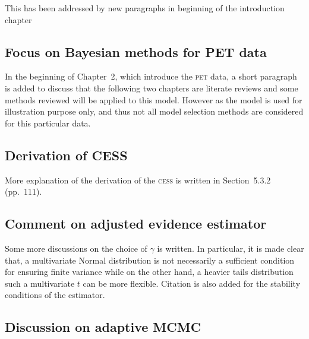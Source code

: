 \documentclass[11pt, fontset=Scala]{marticle}
\begin{document}
This has been addressed by new paragraphs in beginning of the introduction chapter


\subsection{Focus on Bayesian methods for PET data} %
\label{sub:focus_on_bayesian_methods_for_pet_data}

In the beginning of Chapter~2, which introduce the \textsc{pet} data, a short paragraph is added to discuss that the following two chapters are literate reviews and some methods reviewed will be applied to this model. However as the model is used for illustration purpose only, and thus not all model selection methods are considered for this particular data.


\subsection{Derivation of CESS} %
\label{sub:derivation_of_cess}

More explanation of the derivation of the \textsc{cess} is written in Section~5.3.2 (pp.~111).


\subsection{Comment on adjusted evidence estimator} %
\label{sub:comment_on_adjusted_evidence_estimator}

Some more discussions on the choice of $\gamma$ is written. In particular, it is made clear that, a multivariate Normal distribution is not necessarily a sufficient condition for ensuring finite variance while on the other hand, a heavier tails distribution such a multivariate $t$ can be more flexible. Citation is also added for the stability conditions of the estimator.


\subsection{Discussion on adaptive MCMC} %
\label{sub:discussion_on_adaptive_mcmc}
\end{document}
